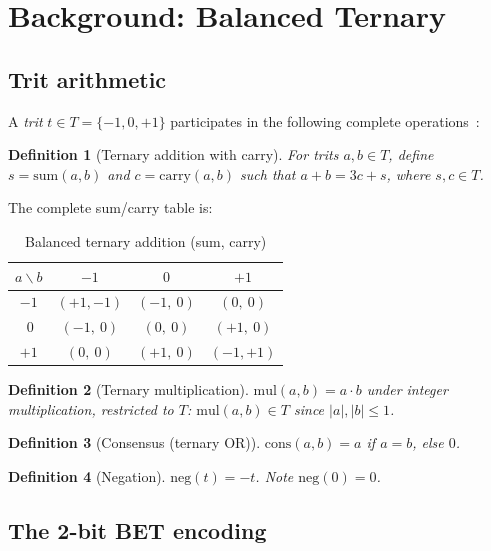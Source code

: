 \documentclass[11pt,a4paper]{article}
\newtheorem{definition}{Definition}
\begin{document}
\section{Background: Balanced Ternary}
\label{sec:background}

\subsection{Trit arithmetic}

A \emph{trit} $t \in T = \{-1, 0, +1\}$ participates in the following
complete operations~\cite{knuth1997art}:

\begin{definition}[Ternary addition with carry]
For trits $a, b \in T$, define $s = \mathrm{sum}(a,b)$ and
$c = \mathrm{carry}(a,b)$ such that $a + b = 3c + s$, where
$s, c \in T$.
\end{definition}

The complete sum/carry table is:

\begin{table}[htbp]
\centering
\small
\caption{Balanced ternary addition (sum, carry)}
\label{tab:add}
\begin{tabular}{c|ccc}
\toprule
$a \backslash b$ & $-1$ & $0$ & $+1$ \\
\midrule
$-1$ & $(+1,-1)$ & $(-1,\ 0)$ & $(0,\ 0)$ \\
$\ 0$ & $(-1,\ 0)$ & $(0,\ 0)$ & $(+1,\ 0)$ \\
$+1$ & $(0,\ 0)$ & $(+1,\ 0)$ & $(-1,+1)$ \\
\bottomrule
\end{tabular}
\end{table}

\begin{definition}[Ternary multiplication]
$\mathrm{mul}(a,b) = a \cdot b$ under integer multiplication,
restricted to $T$: $\mathrm{mul}(a,b) \in T$ since $|a|,|b| \leq 1$.
\end{definition}

\begin{definition}[Consensus (ternary OR)]
$\mathrm{cons}(a,b) = a$ if $a = b$, else $0$.
\end{definition}

\begin{definition}[Negation]
$\mathrm{neg}(t) = -t$. Note $\mathrm{neg}(0) = 0$.
\end{definition}

\subsection{The 2-bit BET encoding}
\end{document}
